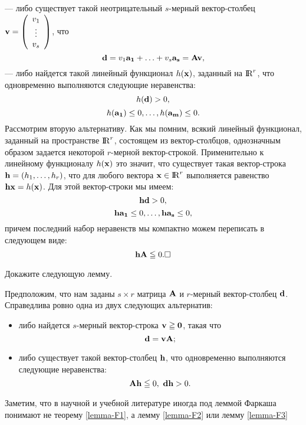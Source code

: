     --- либо существует такой неотрицательный $s$-мерный
    вектор-столбец
    $\mathbf{v}=\left(
              \begin{array}{c}
                v_{1} \\
                \vdots \\
                v_{s} \\
              \end{array}
            \right)$,
            что
       \[\mathbf{d}=v_{1}\mathbf{a_{1}}+\ldots+v_{s}\mathbf{a_{s}}=\mathbf{A}\mathbf{v},\]
    --- либо найдется такой линейный функционал $h(\mathbf{x})$,
    заданный на ${{\rm I\!R}}^{r}$, что одновременно выполняются следующие неравенства:
    \[h(\mathbf{d})>0,\]
  \[h(\mathbf{a_{1}})\leq0,\ldots,h(\mathbf{a_{m}})\leq0.\]
    Рассмотрим вторую альтернативу.
    Как мы помним, всякий линейный функционал, заданный на пространстве
    ${\rm I\!R}^{r}$, состоящем из вектор-столбцов, однозначным образом
    задается некоторой $r$-мерной вектор-строкой. Применительно к
    линейному функционалу $h(\mathbf{x})$ это значит, что существует
    такая вектор-строка $\mathbf{h}=(h_{1},\ldots,h_{r})$, что для любого
    вектора $\mathbf{x}\in{\rm I\!R}^{r}$ выполняется равенство
    $\mathbf{h}\mathbf{x}=h(\mathbf{x})$. Для этой вектор-строки мы имеем:
\[
    \mathbf{h}\mathbf{d}>0,
\]
\[
    \mathbf{h}\mathbf{a_{1}}\leq0,\ldots,\mathbf{h}\mathbf{a_{s}}\leq0,
\]
    причем последний набор неравенств мы компактно можем переписать
    в следующем виде:
\[
    \mathbf{h}\mathbf{A}\leqq0. \Box
\]

\begin{exer}
    Докажите следующую лемму.
\end{exer}


\begin{lem}\label{lemma-F3}
    Предположим, что нам заданы $s\times r$ матрица $\mathbf{A}$ и
    $r$-мерный вектор-столбец $\mathbf{d}$. Справедлива ровно одна из двух
    следующих альтернатив:
\begin{itemize}
    \item [1)\ ] либо найдется $s$-мерный вектор-строка $\mathbf{v}\geqq\mathbf{0}$,
    такая что
    \[\mathbf{d}=\mathbf{v}\mathbf{A};\]

    \item [2)\ ] либо существует такой вектор-столбец $\mathbf{h}$, что
    одновременно выполняются следующие неравенства:
    \[\mathbf{A}\mathbf{h}\leqq0, \ \mathbf{d}\mathbf{h}>0.\]
    \end{itemize}
\end{lem}

    Заметим, что в научной и учебной литературе иногда под леммой Фаркаша понимают не теорему
    \ref{lemma-F1}, а лемму \ref{lemma-F2} или лемму \ref{lemma-F3}










